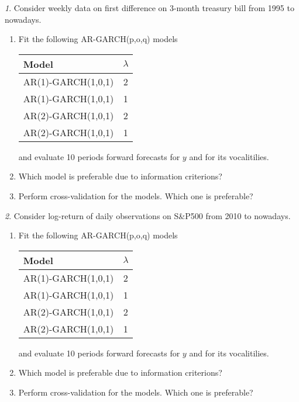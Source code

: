 \documentclass[12pt]{article}
\theoremstyle{remark}
\newtheorem{exercise}{}[section]
\begin{document}
\begin{exercise}
Consider weekly data on first difference on 3-month treasury bill from 1995 to nowadays.
\begin{enumerate}
	\item Fit the following AR-GARCH(p,o,q) models
	\begin{center}
	\begin{tabular}{l|c}
		Model & \(\lambda\) \\ \hline
		AR(1)-GARCH(1,0,1) & 2 \\
		AR(1)-GARCH(1,0,1) & 1 \\
		AR(2)-GARCH(1,0,1) & 2 \\
		AR(2)-GARCH(1,0,1) & 1 \\ \hline
	\end{tabular}
	\end{center} 
	and evaluate 10 periods forward forecasts for \(y\) and for its vocalitilies.
	\item Which model is preferable due to information criterions?
	\item Perform cross-validation for the models. Which one is preferable?
\end{enumerate}
\end{exercise}

\begin{exercise}
Consider log-return of daily observations on S\&P500 from 2010 to nowadays.
\begin{enumerate}
	\item Fit the following AR-GARCH(p,o,q) models
	\begin{center}
	\begin{tabular}{l|c}
		Model & \(\lambda\) \\ \hline
		AR(1)-GARCH(1,0,1) & 2 \\
		AR(1)-GARCH(1,0,1) & 1 \\
		AR(2)-GARCH(1,0,1) & 2 \\
		AR(2)-GARCH(1,0,1) & 1 \\ \hline
	\end{tabular}
	\end{center} 
	and evaluate 10 periods forward forecasts for \(y\) and for its vocalitilies.
	\item Which model is preferable due to information criterions?
	\item Perform cross-validation for the models. Which one is preferable?
\end{enumerate}
\end{exercise}
\end{document}
